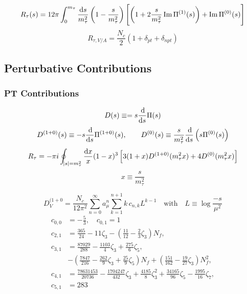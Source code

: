 \documentclass{beamer}
\DeclareMathOperator{\Ima}{Im}
\begin{document}
\begin{frame}
  \begin{equation}
    R_\tau(s) = 12 \pi \int_0^{m_\tau} \frac{\dif s}{m_\tau^2} \left( 1-\frac{s}{m_\tau^2} \right)
    \left[ \left( 1 + 2 \frac{s}{m_\tau^2} \Ima \Pi^{(1)}(s) \right) + \Ima \Pi^{(0)}(s) \right]
  \end{equation}
  \begin{equation}
    R_{\tau,V/A} = \frac{N_c}{2} \left( 1 + \delta_{pt} + \delta_{npt} \right)
  \end{equation}
\end{frame}
\subsection{Perturbative Contributions}
\begin{frame}
  \frametitle{PT Contributions}
  \begin{equation}
    D(s) \equiv =s \frac{\dif}{\dif s} \Pi(s)
  \end{equation}
  \begin{equation}
    D^{(1+0)}(s) \equiv -s \frac{\dif}{\dif s} \Pi^{(1+0)}(s), \qquad D^{(0)}(s) \equiv \frac{s}{m_\tau^2} \frac{\dif}{\dif s} \left( s \Pi^{(0)}(s) \right)
  \end{equation}
  \begin{equation}
    R_\tau = - \pi i \oint_{\abs{s}=m_\tau^2} \frac{\dif x}{x}(1-x)^3 \left[ 3(1+x)D^{(1+0)}(m_\tau^2x) + 4 D^{(0)}(m_\tau^2 x) \right]
  \end{equation}
  \begin{equation}
    x \equiv \frac{s}{m_\tau^2}
  \end{equation} 
\end{frame}
\begin{frame}
  \begin{equation}
    D_V^{(1+0} = \frac{N_c}{12 \pi^2} \sum_{n=0}^\infty a_\mu^n \sum_{k=1}^{n+1} k\, c_{n,k} L^{k-1}
    \quad \text{with} \quad L \equiv \log \frac{-s}{\mu^2}
  \end{equation}
  \begin{align}
    c_{0,0} &= -\frac{5}{3}, \quad c_{0,1} = 1 \\
    c_{2,1} &= \frac{365}{24} - 11 \zeta_3 - \left( \frac{11}{12} - \frac{2}{3}\zeta_3 \right) N_f, \\
    c_{3,1} &= \frac{87029}{288} - \frac{1103}{4} \zeta_3 + \frac{275}{6}\zeta_5, \\
            &- \left( \frac{7847}{216} - \frac{262}{9} \zeta_3 + \frac{25}{9} \zeta_5 \right) N_f + \left( \frac{151}{162} - \frac{19}{27}\zeta_3\right)N_f^2, \\
    c_{4,1} &= \frac{78631453}{20736} - \frac{1704247}{432}\zeta_3 +
              \frac{4185}{8}\zeta_3^2 + \frac{34165}{96}\zeta_5 - \frac{1995}{16}\zeta_7, \\
    c_{5,1} &= 283
  \end{align}
\end{frame}
\end{document}
